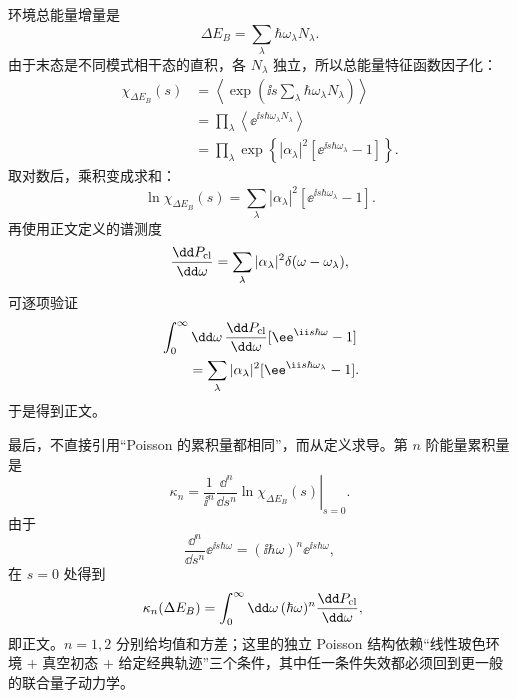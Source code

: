 \begin{derivation}
环境总能量增量是
\begin{equation*}
 \Delta E_B=\sum_\lambda\hbar\omega_\lambda N_\lambda.
\end{equation*}
由于末态是不同模式相干态的直积，各 $N_\lambda$ 独立，所以总能量特征函数因子化：
\begin{align*}
 \chi_{\Delta E_B}(s)
 &=\left\langle
 \exp\!\left(\ii s\sum_\lambda\hbar\omega_\lambda N_\lambda\right)
 \right\rangle\\
 &=\prod_\lambda
 \left\langle \ee^{\ii s\hbar\omega_\lambda N_\lambda}\right\rangle\\
 &=\prod_\lambda
 \exp\!\left\{|\alpha_\lambda|^2
 [\ee^{\ii s\hbar\omega_\lambda}-1]\right\}.
\end{align*}
取对数后，乘积变成求和：
\begin{equation*}
 \ln\chi_{\Delta E_B}(s)
 =\sum_\lambda|\alpha_\lambda|^2
 [\ee^{\ii s\hbar\omega_\lambda}-1].
\end{equation*}
再使用正文定义的谱测度
\begin{equation*}
 \frac{\dd P_{\rm cl}}{\dd\omega}
 =\sum_\lambda|\alpha_\lambda|^2
 \delta(\omega-\omega_\lambda),
\end{equation*}
可逐项验证
\begin{align*}
 &\int_0^\infty\dd\omega\,
 \frac{\dd P_{\rm cl}}{\dd\omega}
 [\ee^{\ii s\hbar\omega}-1]\\
 &\qquad=\sum_\lambda|\alpha_\lambda|^2
 [\ee^{\ii s\hbar\omega_\lambda}-1].
\end{align*}
于是得到正文。

最后，不直接引用“Poisson 的累积量都相同”，而从定义求导。第 $n$ 阶能量累积量是
\begin{equation*}
 \kappa_n
 =\left.\frac1{\ii^n}
 \frac{\dd^n}{\dd s^n}
 \ln\chi_{\Delta E_B}(s)\right|_{s=0}.
\end{equation*}
由于
\begin{equation*}
 \frac{\dd^n}{\dd s^n}
 \ee^{\ii s\hbar\omega}
 =(\ii\hbar\omega)^n \ee^{\ii s\hbar\omega},
\end{equation*}
在 $s=0$ 处得到
\begin{align*}
 \kappa_n(\Delta E_B)
 &=\int_0^\infty\dd\omega\,
 (\hbar\omega)^n
 \frac{\dd P_{\rm cl}}{\dd\omega},
\end{align*}
即正文。$n=1,2$ 分别给均值和方差；这里的独立 Poisson 结构依赖“线性玻色环境 + 真空初态 + 给定经典轨迹”三个条件，其中任一条件失效都必须回到更一般的联合量子动力学。
\end{derivation}

